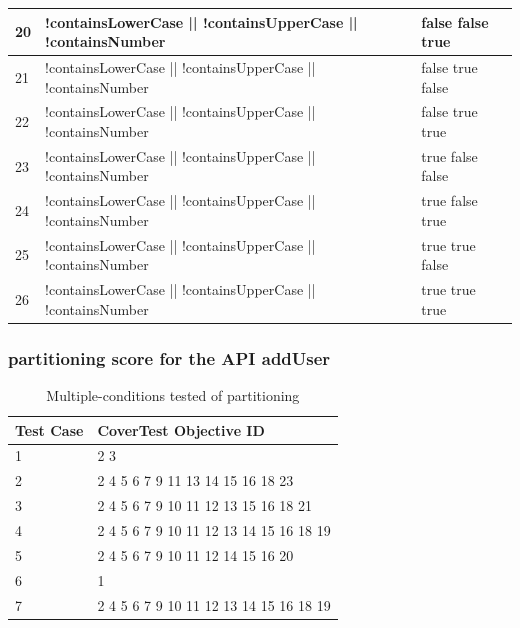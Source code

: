 \documentclass{article}
\begin{document}
\begin{longtable}{|p{2cm}|p{10cm}|p{3cm}|}
\hline
20&!containsLowerCase || !containsUpperCase || !containsNumber&false false true\\
\hline
21&!containsLowerCase || !containsUpperCase || !containsNumber&false true false\\
\hline
22&!containsLowerCase || !containsUpperCase || !containsNumber&false true true\\
\hline
23&!containsLowerCase || !containsUpperCase || !containsNumber&true false false\\
\hline
24&!containsLowerCase || !containsUpperCase || !containsNumber&true false true\\
\hline
25&!containsLowerCase || !containsUpperCase || !containsNumber&true true false\\
\hline
26&!containsLowerCase || !containsUpperCase || !containsNumber&true true true\\
\hline
\end{longtable}
\subsubsection{partitioning score for the API addUser}
\begin{longtable}{|p{2cm}|p{8cm}|}
\caption{Multiple-conditions tested of partitioning}\\
\hline 
Test Case& CoverTest Objective ID\\
\hline  
1&2 3\\
\hline
2&2 4 5 6 7 9 11 13 14 15 16 18 23\\
\hline
3&2 4 5 6 7 9 10 11 12 13 15 16 18 21\\
\hline
4&2 4 5 6 7 9 10 11 12 13 14 15 16 18 19\\
\hline
5&2 4 5 6 7 9 10 11 12 14 15 16 20\\
\hline
6&1\\
\hline
7&2 4 5 6 7 9 10 11 12 13 14 15 16 18 19\\
\hline
\end{longtable}
\end{document}
